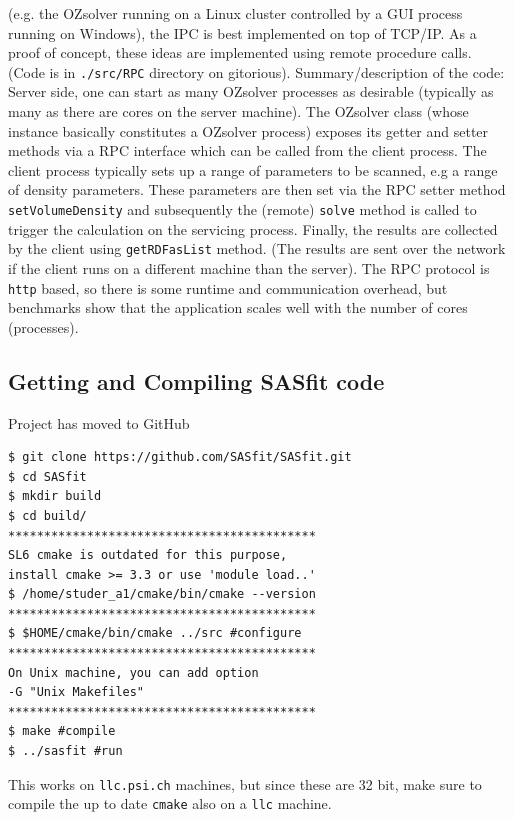 \documentclass[11pt,a4paper]{article}
\begin{document}
(e.g. the OZsolver running on a Linux cluster controlled by a GUI process running on Windows), the IPC is best implemented on top of TCP/IP. 
\newpage
As a proof of concept, these ideas are implemented using remote procedure calls. (Code is in \texttt{./src/RPC} directory on gitorious).
\newline Summary/description of the code: Server side, one can start as many OZsolver processes as desirable 
(typically as many as there are cores on the server machine).
The OZsolver class (whose instance basically constitutes a OZsolver process) exposes its getter and setter methods via a RPC interface
which can be called from the client process. The client process typically sets up a range of parameters to be scanned, e.g a range of density parameters.
These parameters are then set via the RPC setter method \texttt{setVolumeDensity} and 
subsequently the (remote) \texttt{solve} method is called to trigger the calculation on the servicing process.
Finally, the results are collected by the client using \texttt{getRDFasList} method. (The results are sent over the network if the client runs on
a different machine than the server). \newline 
The RPC protocol is \texttt{http} based, so there is some runtime and communication overhead, but benchmarks show that the application
scales well with the number of cores (processes).


\subsection{Getting and Compiling SASfit code}
Project has moved to GitHub
\lstset{language=bash}
\begin{lstlisting}[frame=single]  
$ git clone https://github.com/SASfit/SASfit.git
$ cd SASfit
$ mkdir build
$ cd build/
*******************************************
SL6 cmake is outdated for this purpose, 
install cmake >= 3.3 or use 'module load..'
$ /home/studer_a1/cmake/bin/cmake --version
*******************************************
$ $HOME/cmake/bin/cmake ../src #configure
*******************************************
On Unix machine, you can add option
-G "Unix Makefiles"
*******************************************
$ make #compile
$ ../sasfit #run
\end{lstlisting}
This works on \texttt{llc.psi.ch} machines, but since these are 32 bit, make sure to compile the up to date \texttt{cmake} also on a \texttt{llc} machine.
\newpage
\end{document}
